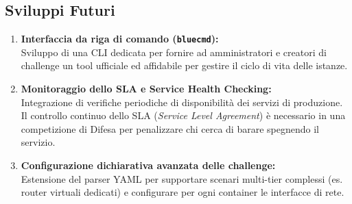 \subsection{Sviluppi Futuri}\label{sviluppi-futuri}

\begin{enumerate}
\def\labelenumi{\arabic{enumi}.}
\item
  \textbf{Interfaccia da riga di comando
  (\passthrough{\lstinline!bluecmd!}):}\\
  Sviluppo di una CLI dedicata per fornire ad amministratori e creatori
  di challenge un tool ufficiale ed affidabile per gestire il ciclo di
  vita delle istanze.
\item
  \textbf{Monitoraggio dello SLA e Service Health Checking:}\\
  Integrazione di verifiche periodiche di disponibilità dei servizi di
  produzione. Il controllo continuo dello SLA (\emph{Service Level
  Agreement}) è necessario in una competizione di Difesa per penalizzare
  chi cerca di barare spegnendo il servizio.
\item
  \textbf{Configurazione dichiarativa avanzata delle challenge:}\\
  Estensione del parser YAML per supportare scenari multi-tier complessi
  (es. router virtuali dedicati) e configurare per ogni container le
  interfacce di rete.
\end{enumerate}
